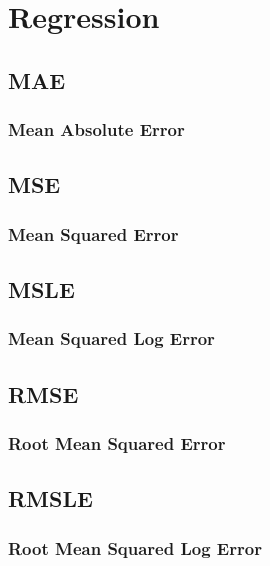 \chapter{Regression}

\clearpage
\thispagestyle{customstyle}
\section{MAE}
\subsection{Mean Absolute Error}

\clearpage
\thispagestyle{customstyle}
\section{MSE}
\subsection{Mean Squared Error}

\clearpage
\thispagestyle{customstyle}
\section{MSLE}
\subsection{Mean Squared Log Error}

\clearpage
\thispagestyle{customstyle}
\section{RMSE}
\subsection{Root Mean Squared Error}

\clearpage
\thispagestyle{customstyle}
\section{RMSLE}
\subsection{Root Mean Squared Log Error}

